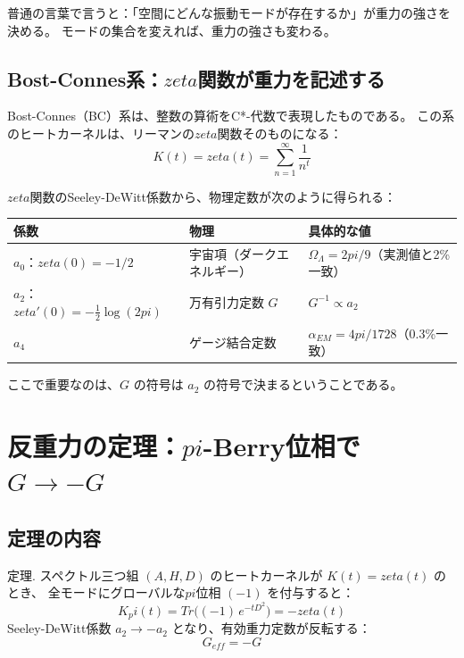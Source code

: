\documentclass[11pt,a4paper]{article}
\def\pi{pi}%
\def\zeta{zeta}%
\def\mathrm#1{#1}%
\def\textbf#1{#1}%
\begin{document}
普通の言葉で言うと：「空間にどんな振動モードが存在するか」が重力の強さを決める。
モードの集合を変えれば、重力の強さも変わる。

\subsection{Bost-Connes系：$\zeta$関数が重力を記述する}

Bost-Connes（BC）系は、整数の算術をC*-代数で表現したものである。
この系のヒートカーネルは、リーマンの$\zeta$関数そのものになる：
\begin{equation}
  K(t) = \zeta(t) = \sum_{n=1}^{\infty} \frac{1}{n^t}
\end{equation}

$\zeta$関数のSeeley-DeWitt係数から、物理定数が次のように得られる：
\begin{center}
\begin{tabular}{lll}
\toprule
係数 & 物理 & 具体的な値 \\
\midrule
$a_0$：$\zeta(0) = -1/2$ & 宇宙項（ダークエネルギー） & $\Omega_\Lambda = 2\pi/9$（実測値と2\%一致） \\
$a_2$：$\zeta'(0) = -\frac{1}{2}\log(2\pi)$ & 万有引力定数 $G$ & $G^{-1} \propto a_2$ \\
$a_4$ & ゲージ結合定数 & $\alpha_{\mathrm{EM}} = 4\pi/1728$（0.3\%一致） \\
\bottomrule
\end{tabular}
\end{center}

ここで重要なのは、\textbf{$G$ の符号}は $a_2$ の符号で決まるということである。


\section{反重力の定理：$\pi$-Berry位相で $G \to -G$}

\subsection{定理の内容}

\begin{tcolorbox}[colback=green!5,colframe=green!60!black,title=トポロジカル反重力定理]
\textbf{定理.}
スペクトル三つ組 $(A, H, D)$ のヒートカーネルが $K(t) = \zeta(t)$ のとき、
全モードにグローバルな$\pi$位相 $(-1)$ を付与すると：
\begin{equation}
  K_\pi(t) = \mathrm{Tr}\bigl((-1)\,e^{-tD^2}\bigr) = -\zeta(t)
\end{equation}
Seeley-DeWitt係数 $a_2 \to -a_2$ となり、有効重力定数が反転する：
\begin{equation}
  \boxed{\; G_{\mathrm{eff}} = -G \;}
\end{equation}
\end{tcolorbox}
\end{document}

